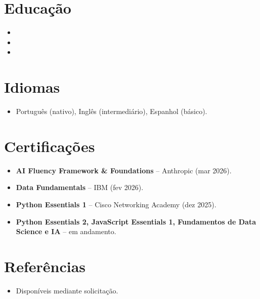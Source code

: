\documentclass[11pt,a4paper,sans]{moderncv}
\begin{document}
\section{Educação}
\vspace{1pt}
\begin{itemize}

\item{}

\vspace{3pt}

\item{}

\vspace{3pt}

\item{}

\end{itemize}


\section{Idiomas}
\vspace{1pt}
\begin{itemize}
\item Português (nativo), Inglês (intermediário), Espanhol (básico).
\end{itemize}


\section{Certificações}
\vspace{1pt}
\begin{itemize}
\item{\textbf{AI Fluency Framework \& Foundations} -- Anthropic (mar 2026).}
\item{\textbf{Data Fundamentals} -- IBM (fev 2026).}
\item{\textbf{Python Essentials 1} -- Cisco Networking Academy (dez 2025).}
\item{\textbf{Python Essentials 2, JavaScript Essentials 1, Fundamentos de Data Science e IA} -- em andamento.}
\end{itemize}


\section{Referências}
\vspace{1pt}
\begin{itemize}
\item{Disponíveis mediante solicitação.}
\end{itemize}
\end{document}

